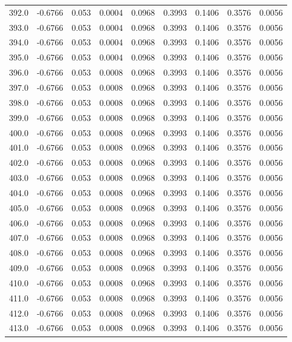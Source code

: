 \begin{longtable}{lrrrrrrrr}
392.0 & -0.6766 & 0.053 & 0.0004 & 0.0968 & 0.3993 & 0.1406 & 0.3576 & 0.0056 \\
393.0 & -0.6766 & 0.053 & 0.0004 & 0.0968 & 0.3993 & 0.1406 & 0.3576 & 0.0056 \\
394.0 & -0.6766 & 0.053 & 0.0004 & 0.0968 & 0.3993 & 0.1406 & 0.3576 & 0.0056 \\
395.0 & -0.6766 & 0.053 & 0.0004 & 0.0968 & 0.3993 & 0.1406 & 0.3576 & 0.0056 \\
396.0 & -0.6766 & 0.053 & 0.0008 & 0.0968 & 0.3993 & 0.1406 & 0.3576 & 0.0056 \\
397.0 & -0.6766 & 0.053 & 0.0008 & 0.0968 & 0.3993 & 0.1406 & 0.3576 & 0.0056 \\
398.0 & -0.6766 & 0.053 & 0.0008 & 0.0968 & 0.3993 & 0.1406 & 0.3576 & 0.0056 \\
399.0 & -0.6766 & 0.053 & 0.0008 & 0.0968 & 0.3993 & 0.1406 & 0.3576 & 0.0056 \\
400.0 & -0.6766 & 0.053 & 0.0008 & 0.0968 & 0.3993 & 0.1406 & 0.3576 & 0.0056 \\
401.0 & -0.6766 & 0.053 & 0.0008 & 0.0968 & 0.3993 & 0.1406 & 0.3576 & 0.0056 \\
402.0 & -0.6766 & 0.053 & 0.0008 & 0.0968 & 0.3993 & 0.1406 & 0.3576 & 0.0056 \\
403.0 & -0.6766 & 0.053 & 0.0008 & 0.0968 & 0.3993 & 0.1406 & 0.3576 & 0.0056 \\
404.0 & -0.6766 & 0.053 & 0.0008 & 0.0968 & 0.3993 & 0.1406 & 0.3576 & 0.0056 \\
405.0 & -0.6766 & 0.053 & 0.0008 & 0.0968 & 0.3993 & 0.1406 & 0.3576 & 0.0056 \\
406.0 & -0.6766 & 0.053 & 0.0008 & 0.0968 & 0.3993 & 0.1406 & 0.3576 & 0.0056 \\
407.0 & -0.6766 & 0.053 & 0.0008 & 0.0968 & 0.3993 & 0.1406 & 0.3576 & 0.0056 \\
408.0 & -0.6766 & 0.053 & 0.0008 & 0.0968 & 0.3993 & 0.1406 & 0.3576 & 0.0056 \\
409.0 & -0.6766 & 0.053 & 0.0008 & 0.0968 & 0.3993 & 0.1406 & 0.3576 & 0.0056 \\
410.0 & -0.6766 & 0.053 & 0.0008 & 0.0968 & 0.3993 & 0.1406 & 0.3576 & 0.0056 \\
411.0 & -0.6766 & 0.053 & 0.0008 & 0.0968 & 0.3993 & 0.1406 & 0.3576 & 0.0056 \\
412.0 & -0.6766 & 0.053 & 0.0008 & 0.0968 & 0.3993 & 0.1406 & 0.3576 & 0.0056 \\
413.0 & -0.6766 & 0.053 & 0.0008 & 0.0968 & 0.3993 & 0.1406 & 0.3576 & 0.0056 \\

\end{longtable}
